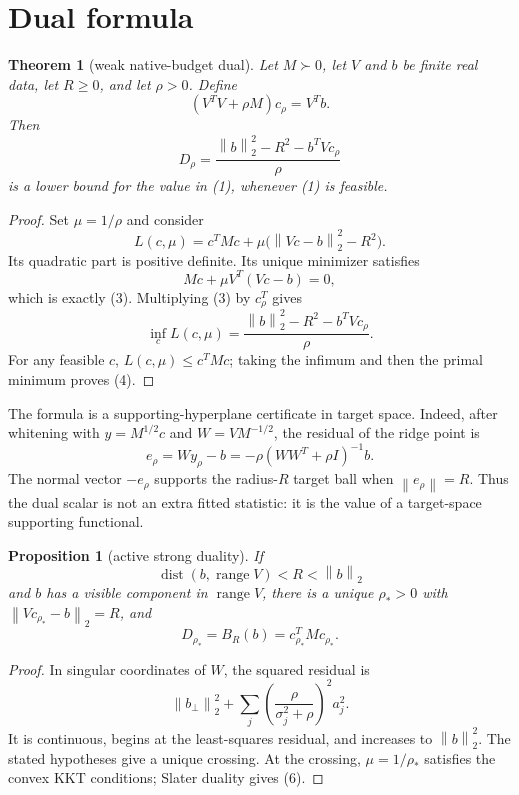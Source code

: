 \documentclass[11pt]{article}
\newtheorem{theorem}{Theorem}
\newtheorem{proposition}{Proposition}
\newcommand{\norm}[1]{\left\lVert #1\right\rVert}
\newcommand{\drho}{D_\rho}
\begin{document}
\section{Dual formula}

\begin{theorem}[weak native-budget dual]
Let $M\succ0$, let $V$ and $b$ be finite real data, let $R\geq0$, and let
$\rho>0$.  Define
\[
 (V^TV+\rho M)c_\rho=V^Tb.                                  \tag{3}
\]
Then
\[
 \drho=\frac{\norm{b}_2^2-R^2-b^TVc_\rho}{\rho}                \tag{4}
\]
is a lower bound for the value in (1), whenever (1) is feasible.
\end{theorem}

\begin{proof}
Set $\mu=1/\rho$ and consider
\[
 L(c,\mu)=c^TMc+\mu\bigl(\norm{Vc-b}_2^2-R^2\bigr).
\]
Its quadratic part is positive definite.  Its unique minimizer satisfies
\[
 Mc+\mu V^T(Vc-b)=0,
\]
which is exactly (3).  Multiplying (3) by $c_\rho^T$ gives
\[
 \inf_c L(c,\mu)
 =\frac{\norm{b}_2^2-R^2-b^TVc_\rho}{\rho}.
\]
For any feasible $c$, $L(c,\mu)\leq c^TMc$; taking the infimum and then the
primal minimum proves (4).
\end{proof}

The formula is a supporting-hyperplane certificate in target space.  Indeed,
after whitening with $y=M^{1/2}c$ and $W=VM^{-1/2}$, the residual of the
ridge point is
\[
 e_\rho=Wy_\rho-b=-\rho(WW^T+\rho I)^{-1}b.                  \tag{5}
\]
The normal vector $-e_\rho$ supports the radius-$R$ target ball when
$\norm{e_\rho}=R$.  Thus the dual scalar is not an extra fitted statistic:
it is the value of a target-space supporting functional.

\begin{proposition}[active strong duality]
If
\[
 \operatorname{dist}(b,\operatorname{range}V)<R<\norm{b}_2
\]
and $b$ has a visible component in $\operatorname{range}V$, there is a
unique $\rho_\ast>0$ with $\norm{Vc_{\rho_\ast}-b}_2=R$, and
\[
 D_{\rho_\ast}=B_R(b)=c_{\rho_\ast}^TMc_{\rho_\ast}.          \tag{6}
\]
\end{proposition}

\begin{proof}
In singular coordinates of $W$, the squared residual is
\[
 \norm{b_\perp}_2^2+
 \sum_j\left(\frac{\rho}{\sigma_j^2+\rho}\right)^2a_j^2.
\]
It is continuous, begins at the least-squares residual, and increases to
$\norm{b}_2^2$.  The stated hypotheses give a unique crossing.  At the
crossing, $\mu=1/\rho_\ast$ satisfies the convex KKT conditions; Slater
duality gives (6).
\end{proof}
\end{document}

